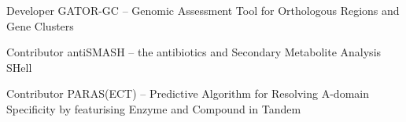 {}
\begin{cvhonors}
\cvhonor
{Developer}
{GATOR-GC – Genomic Assessment Tool for Orthologous Regions and Gene Clusters}
{}

\cvhonor
{Contributor}
{antiSMASH – the antibiotics and Secondary Metabolite Analysis SHell}
{ \enspace {}}

\cvhonor
{Contributor}
{PARAS(ECT) – Predictive Algorithm for Resolving A-domain Specificity by featurising Enzyme and Compound in Tandem}
{ \enspace {}}

\end{cvhonors}